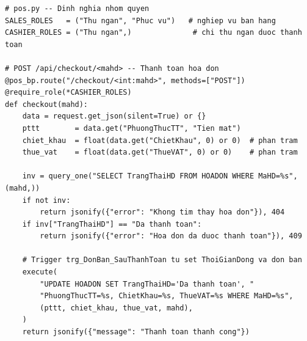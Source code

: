 \documentclass[12pt,a4paper]{report}
\begin{document}
\begin{lstlisting}[style=mypython,
  caption={File \texttt{pos.py} -- Route thanh toán \texttt{POST /api/checkout/\{maHd\}}},
  label=lst:python-checkout]
# pos.py -- Dinh nghia nhom quyen
SALES_ROLES   = ("Thu ngan", "Phuc vu")   # nghiep vu ban hang
CASHIER_ROLES = ("Thu ngan",)              # chi thu ngan duoc thanh toan

# POST /api/checkout/<mahd> -- Thanh toan hoa don
@pos_bp.route("/checkout/<int:mahd>", methods=["POST"])
@require_role(*CASHIER_ROLES)
def checkout(mahd):
    data = request.get_json(silent=True) or {}
    pttt        = data.get("PhuongThucTT", "Tien mat")
    chiet_khau  = float(data.get("ChietKhau", 0) or 0)  # phan tram
    thue_vat    = float(data.get("ThueVAT", 0) or 0)    # phan tram

    inv = query_one("SELECT TrangThaiHD FROM HOADON WHERE MaHD=%s", (mahd,))
    if not inv:
        return jsonify({"error": "Khong tim thay hoa don"}), 404
    if inv["TrangThaiHD"] == "Da thanh toan":
        return jsonify({"error": "Hoa don da duoc thanh toan"}), 409

    # Trigger trg_DonBan_SauThanhToan tu set ThoiGianDong va don ban
    execute(
        "UPDATE HOADON SET TrangThaiHD='Da thanh toan', "
        "PhuongThucTT=%s, ChietKhau=%s, ThueVAT=%s WHERE MaHD=%s",
        (pttt, chiet_khau, thue_vat, mahd),
    )
    return jsonify({"message": "Thanh toan thanh cong"})
\end{lstlisting}
\end{document}
